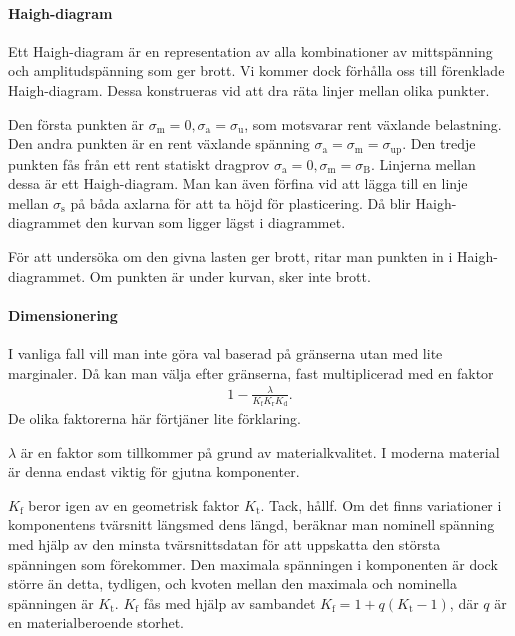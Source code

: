 \paragraph{Haigh-diagram}
Ett Haigh-diagram är en representation av alla kombinationer av mittspänning och amplitudspänning som ger brott. Vi kommer dock förhålla oss till förenklade Haigh-diagram. Dessa konstrueras vid att dra räta linjer mellan olika punkter.

Den första punkten är $\sigma_{\text{m}} = 0, \sigma_{\text{a}} = \sigma_{\text{u}}$, som motsvarar rent växlande belastning. Den andra punkten är en rent växlande spänning $\sigma_{\text{a}} = \sigma_{\text{m}} = \sigma_{\text{up}}$. Den tredje punkten fås från ett rent statiskt dragprov $\sigma_{\text{a}} = 0, \sigma_{\text{m}} = \sigma_{\text{B}}$. Linjerna mellan dessa är ett Haigh-diagram. Man kan även förfina vid att lägga till en linje mellan $\sigma_{\text{s}}$ på båda axlarna för att ta höjd för plasticering. Då blir Haigh-diagrammet den kurvan som ligger lägst i diagrammet.

För att undersöka om den givna lasten ger brott, ritar man punkten in i Haigh-diagrammet. Om punkten är under kurvan, sker inte brott.

\paragraph{Dimensionering}
I vanliga fall vill man inte göra val baserad på gränserna utan med lite marginaler. Då kan man välja efter gränserna, fast multiplicerad med en faktor
\begin{align*}
	1 - \frac{\lambda}{K_{\text{f}}K_{\text{r}}K_{\text{d}}}.
\end{align*}
De olika faktorerna här förtjäner lite förklaring.

$\lambda$ är en faktor som tillkommer på grund av materialkvalitet. I moderna material är denna endast viktig för gjutna komponenter.

$K_{\text{f}}$ beror igen av en geometrisk faktor $K_{\text{t}}$. Tack, hållf. Om det finns variationer i komponentens tvärsnitt längsmed dens längd, beräknar man nominell spänning med hjälp av den minsta tvärsnittsdatan för att uppskatta den största spänningen som förekommer. Den maximala spänningen i komponenten är dock större än detta, tydligen, och kvoten mellan den maximala och nominella spänningen är $K_{\text{t}}$. $K_{\text{f}}$ fås med hjälp av sambandet $K_{\text{f}} = 1 + q(K_{\text{t}} - 1)$, där $q$ är en materialberoende storhet.

